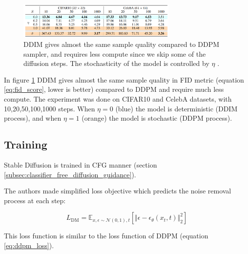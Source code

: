 \begin{figure}
    \centering
    \includegraphics[width=0.7\textwidth]{images/diffusion_models/stable_diffusion/ddim_sample_quality.png}
    \caption{DDIM gives almost the same sample quality compared to DDPM sampler, and requires less compute since we skip some of the diffusion steps. The stochasticity of the model is controlled by $\eta$ \cite{ddim}.}
    \label{fig:ddim_sample_quality}
\end{figure}

In figure \ref{fig:ddim_sample_quality} DDIM gives almost the same sample quality in FID metric (equation \ref{eq:fid_score}, lower is better) compared to DDPM and require much less compute. The experiment was done on CIFAR10 and CelebA datasets, with 10,20,50,100,1000 steps. When $\eta = 0$ (blue) the model is deterministic (DDIM process), and when $\eta = 1$ (orange) the model is stochastic (DDPM process).















\subsection{Training}

Stable Diffusion is trained in CFG manner (section \ref{subsec:classifier_free_diffusion_guidance}).

The authors made simplified loss objective which predicts the noise removal process at each step:

\[
    L_{\text{DM}} = \mathbb{E}_{x, \epsilon \sim \mathcal{N} (0, 1), t} \left[ \Vert \epsilon - \epsilon_\theta(x_t, t) \Vert _2^2 \right]
\]

This loss function is similar to the loss function of DDPM (equation \ref{eq:ddpm_loss}).













